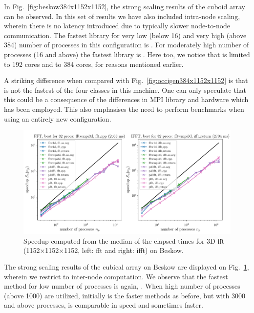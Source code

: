 In Fig.~\ref{fig:beskow384x1152x1152}, the strong scaling results of the cuboid
array can be observed. In this set of results we have also included intra-node
scaling, wherein there is no latency introduced due to typically slower
node-to-node communication. The fastest library for very low (below 16) and
very high (above 384) number of processes in this configuration is
. For moderately high number of processes (16 and above) the
fastest library is . Here too, we notice that
 is limited to 192 cores and  to 384
cores, for reasons mentioned earlier.

A striking difference when compared with Fig.~\ref{fig:occigen384x1152x1152} is
that  is not the fastest of the four classes in this machine.
One can only speculate that this could be a consequence of the differences in MPI
library and hardware which has been employed. This also emphasises the need to
perform benchmarks when using an entirely new configuration.

\begin{figure}[htp!]
\centering
\includegraphics[width=\linewidth]{tmp/fig_beskow_1152x1152x1152}
\caption{Speedup computed from the median of the elapsed times for 3D fft
(1152$\times$1152$\times$1152, left: fft and right: ifft) on Beskow.}
\label{fig:beskow1152x1152x1152}
\end{figure}

The strong scaling results of the cubical array on Beskow are displayed on
Fig.~\ref{fig:beskow1152x1152x1152}, wherein we restrict to inter-node
computation.  We observe that the fastest method for low number of processes is
again, . When high number of processes (above 1000)
are utilized, initially  is the faster methods as before,
but with 3000 and above processes,  is comparable in speed and
sometimes faster.

